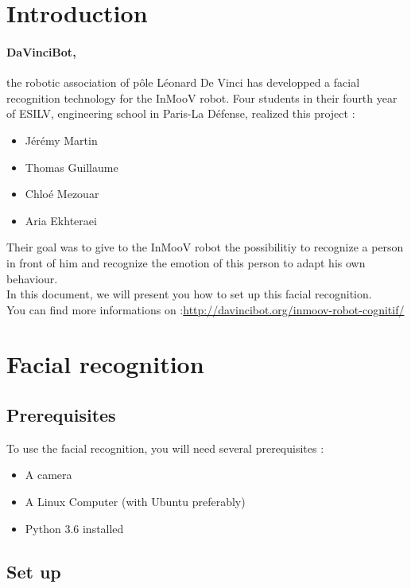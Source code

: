 \documentclass[12pt, oneside]{article}
\begin{document}
\tableofcontents
\newpage

\section{Introduction}

\paragraph{DaVinciBot,} the robotic association of pôle Léonard De Vinci has developped a facial recognition technology for the InMooV robot.
Four students  in their fourth year of ESILV, engineering school in Paris-La Défense, realized this project :
 
\begin{itemize}
	\item Jérémy Martin
	\item Thomas Guillaume
	\item Chloé Mezouar 
	\item Aria Ekhteraei 
\end{itemize}

Their goal was to give to the InMooV robot the possibilitiy to recognize a person in front of him and recognize the emotion of this person to adapt his own behaviour. \\
In this document, we will present you how to set up this facial recognition. \\
You can find more informations on :\url{http://davincibot.org/inmoov-robot-cognitif/}


\section{Facial recognition}
\subsection{Prerequisites}

To use the facial recognition, you will need several prerequisites :
\begin{itemize}
	\item A camera
	\item A Linux Computer (with Ubuntu preferably)
	\item Python 3.6 installed
\end{itemize}

\subsection{Set up}
\end{document}
